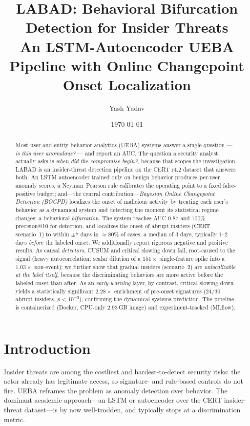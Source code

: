 \documentclass[11pt]{article}
\title{\textbf{LABAD: Behavioral Bifurcation Detection for Insider Threats}\\
\large An LSTM-Autoencoder UEBA Pipeline with Online Changepoint Onset Localization}
\author{Yash Yadav}
\date{\today}
\begin{document}
\maketitle

\begin{abstract}
\noindent
Most user-and-entity behavior analytics (UEBA) systems answer a single
question --- \emph{is this user anomalous?} --- and report an AUC. The
question a security analyst actually asks is \emph{when did the compromise
begin?}, because that scopes the investigation. LABAD is an insider-threat
detection pipeline on the CERT r4.2 dataset that answers both. An LSTM
autoencoder trained only on benign behavior produces per-user anomaly
scores; a Neyman--Pearson rule calibrates the operating point to a fixed
false-positive budget; and---the central contribution---\emph{Bayesian
Online Changepoint Detection (BOCPD)} localizes the onset of malicious
activity by treating each user's behavior as a dynamical system and
detecting the moment its statistical regime changes: a behavioral
\emph{bifurcation}. The system reaches AUC $0.87$ and $100\%$
precision@10 for detection, and localizes the onset of abrupt insiders
(CERT scenario~1) to within $\pm 7$ days in $\approx 80\%$ of cases, a
median of $3$ days, typically $1$--$2$ days \emph{before} the labeled
onset. We additionally report rigorous negative and positive results. As causal
\emph{detectors}, CUSUM and critical slowing down fail, root-caused to the
signal (heavy autocorrelation; scalar dilution of a $151\times$ single-feature
spike into a $1.03\times$ non-event); we further show that gradual insiders
(scenario~2) are \emph{unlocalizable at the label itself}, because the
discriminating behaviors are more active before the labeled onset than after.
As an \emph{early-warning} layer, by contrast, critical slowing down yields a
statistically significant $2.28\times$ enrichment of pre-onset signatures
($24/30$ abrupt insiders, $p<10^{-3}$), confirming the dynamical-systems
prediction. The pipeline is containerized (Docker, CPU-only $2.93$\,GB image)
and experiment-tracked (MLflow).
\end{abstract}

\section{Introduction}

Insider threats are among the costliest and hardest-to-detect security
risks: the actor already has legitimate access, so signature- and
rule-based controls do not fire. UEBA reframes the problem as anomaly
detection over behavior. The dominant academic approach---an LSTM or
autoencoder over the CERT insider-threat dataset---is by now well-trodden,
and typically stops at a discrimination metric.
\end{document}
